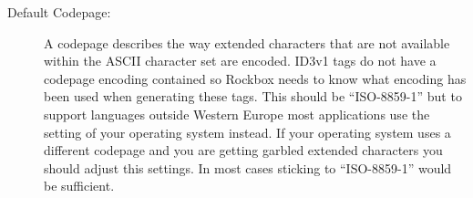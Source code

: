 \begin{description}
{    }
    \item[Default Codepage:]
      A codepage describes the way extended characters that are not available
      within the ASCII character set are encoded. ID3v1 tags do not have a
      codepage encoding contained so Rockbox needs to know what encoding has
      been used when generating these tags. This should be ``ISO-8859-1'' but
      to support languages outside Western Europe most applications use
      the setting of your operating system instead. If your operating system
      uses a different codepage and you are getting garbled extended characters
      you should adjust this settings. In most cases sticking to
      ``ISO-8859-1'' would be sufficient.
  \end{description}
